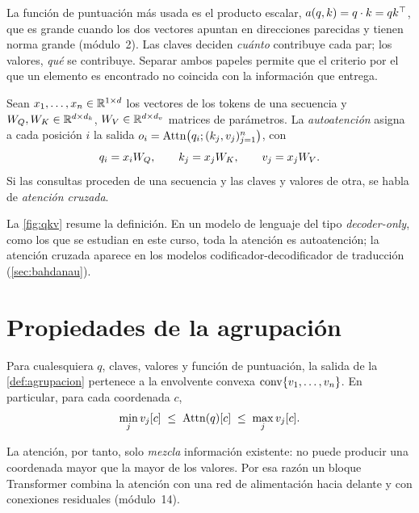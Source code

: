 La función de puntuación más usada es el producto escalar, $a(q,k)=q\cdot k=qk^{\top}$, que es grande cuando los dos vectores apuntan en direcciones parecidas y tienen norma grande (módulo~2). Las claves deciden \emph{cuánto} contribuye cada par; los valores, \emph{qué} se contribuye. Separar ambos papeles permite que el criterio por el que un elemento es encontrado no coincida con la información que entrega.

\addtocounter{figure}{1}%

\begin{definicion}[Autoatención]\label{def:autoatencion}
Sean $x_1,\dots,x_n\in\mathbb{R}^{1\times d}$ los vectores de los tokens de una secuencia y $W_{Q},W_{K}\in\mathbb{R}^{d\times d_k}$, $W_{V}\in\mathbb{R}^{d\times d_v}$ matrices de parámetros. La \emph{autoatención} asigna a cada posición $i$ la salida $o_i=\operatorname{Attn}\bigl(q_i;(k_j,v_j)_{j=1}^{n}\bigr)$, con
\[
q_i=x_iW_{Q},\qquad k_j=x_jW_{K},\qquad v_j=x_jW_{V} .
\]
Si las consultas proceden de una secuencia y las claves y valores de otra, se habla de \emph{atención cruzada}.
\end{definicion}

\begin{observacion}
La \cref{fig:qkv} resume la definición. En un modelo de lenguaje del tipo \emph{decoder-only}, como los que se estudian en este curso, toda la atención es autoatención; la atención cruzada aparece en los modelos codificador-decodificador de traducción (\cref{sec:bahdanau}).
\end{observacion}

\section{Propiedades de la agrupación}

\begin{proposicion}\label{prop:convexa}
Para cualesquiera $q$, claves, valores y función de puntuación, la salida de la \cref{def:agrupacion} pertenece a la envolvente convexa $\operatorname{conv}\{v_1,\dots,v_n\}$. En particular, para cada coordenada $c$,
\[
\min_j v_j[c]\;\le\;\operatorname{Attn}(q)[c]\;\le\;\max_j v_j[c].
\]
\end{proposicion}

La atención, por tanto, solo \emph{mezcla} información existente: no puede producir una coordenada mayor que la mayor de los valores. Por esa razón un bloque Transformer combina la atención con una red de alimentación hacia delante y con conexiones residuales (módulo~14).

